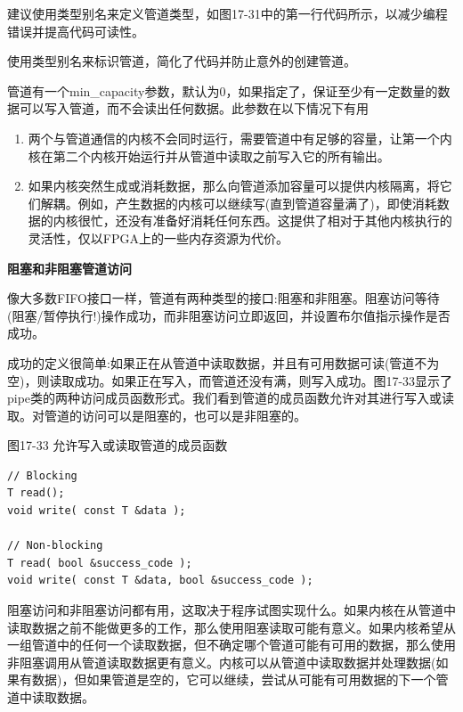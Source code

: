 建议使用类型别名来定义管道类型，如图17-31中的第一行代码所示，以减少编程错误并提高代码可读性。\par

\begin{tcolorbox}[colback=red!5!white,colframe=red!75!black]
使用类型别名来标识管道，简化了代码并防止意外的创建管道。
\end{tcolorbox}

管道有一个min\_capacity参数，默认为0，如果指定了，保证至少有一定数量的数据可以写入管道，而不会读出任何数据。此参数在以下情况下有用\par

\begin{enumerate}
	\item 两个与管道通信的内核不会同时运行，需要管道中有足够的容量，让第一个内核在第二个内核开始运行并从管道中读取之前写入它的所有输出。
	\item 如果内核突然生成或消耗数据，那么向管道添加容量可以提供内核隔离，将它们解耦。例如，产生数据的内核可以继续写(直到管道容量满了)，即使消耗数据的内核很忙，还没有准备好消耗任何东西。这提供了相对于其他内核执行的灵活性，仅以FPGA上的一些内存资源为代价。
\end{enumerate}

\hspace*{\fill} \par %
\textbf{阻塞和非阻塞管道访问}

像大多数FIFO接口一样，管道有两种类型的接口:阻塞和非阻塞。阻塞访问等待(阻塞/暂停执行!)操作成功，而非阻塞访问立即返回，并设置布尔值指示操作是否成功。\par

成功的定义很简单:如果正在从管道中读取数据，并且有可用数据可读(管道不为空)，则读取成功。如果正在写入，而管道还没有满，则写入成功。图17-33显示了pipe类的两种访问成员函数形式。我们看到管道的成员函数允许对其进行写入或读取。对管道的访问可以是阻塞的，也可以是非阻塞的。\par

\hspace*{\fill} \par %
图17-33 允许写入或读取管道的成员函数
\begin{lstlisting}[caption={}]
// Blocking
T read();
void write( const T &data );

// Non-blocking
T read( bool &success_code );
void write( const T &data, bool &success_code ); 
\end{lstlisting}

阻塞访问和非阻塞访问都有用，这取决于程序试图实现什么。如果内核在从管道中读取数据之前不能做更多的工作，那么使用阻塞读取可能有意义。如果内核希望从一组管道中的任何一个读取数据，但不确定哪个管道可能有可用的数据，那么使用非阻塞调用从管道读取数据更有意义。内核可以从管道中读取数据并处理数据(如果有数据)，但如果管道是空的，它可以继续，尝试从可能有可用数据的下一个管道中读取数据。\par

